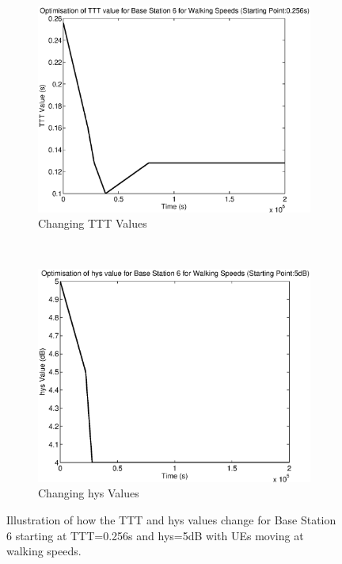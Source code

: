 \begin{figure}[H]
        \centering
        \begin{subfigure}[b]{0.49\textwidth}
                \includegraphics[width=\textwidth]{figures/graphs/walkmid/TTT6.eps}
                \caption{Changing TTT Values}
        \end{subfigure}%
        ~ %
        \begin{subfigure}[b]{0.49\textwidth}
                \includegraphics[width=\textwidth]{figures/graphs/walkmid/hys6.eps}
                \caption{Changing hys Values}
        \end{subfigure}
        \caption{Illustration of how the TTT and hys values change for Base Station 6 starting at TTT=0.256s and hys=5dB with UEs moving at walking speeds.}
\end{figure}
